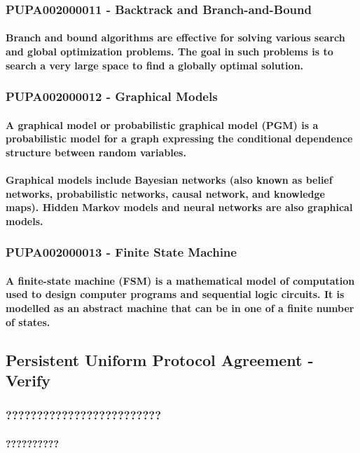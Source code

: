 \subsubsection{PUPA002000011 - Backtrack and Branch-and-Bound}
\paragraph{Branch and bound algorithms are effective for solving various search and global optimization problems. The goal in such problems is to search a very large space to find a globally optimal solution.}
\subsubsection{PUPA002000012 - Graphical Models}
\paragraph{A graphical model or probabilistic graphical model (PGM) is a probabilistic model for a graph expressing the conditional dependence structure between random variables.}
\paragraph{Graphical models include Bayesian networks (also known as belief networks, probabilistic networks, causal network, and knowledge maps). Hidden Markov models and neural networks are also graphical models.}
\subsubsection{PUPA002000013 - Finite State Machine}
\paragraph{A finite-state machine (FSM) is a mathematical model of computation used to design computer programs and sequential logic circuits. It is modelled as an abstract machine that can be in one of a finite number of states.}
\subsection{Persistent Uniform Protocol Agreement - Verify}
\subsubsection{?????????????????????????}
\paragraph{??????????}
